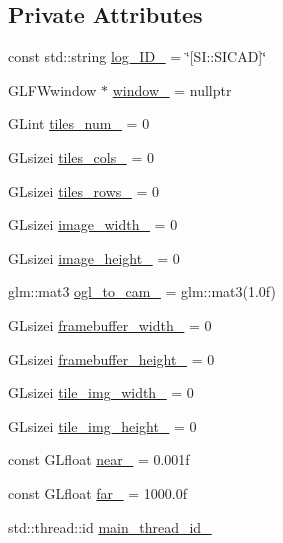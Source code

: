 \subsection*{Private Attributes}
\begin{DoxyCompactItemize}
\item 
const std\+::string \mbox{\hyperlink{classSICAD_a9eb34b659cac13b8442ca821455cc1f1}{log\+\_\+\+I\+D\+\_\+}} = \char`\"{}\mbox{[}S\+I\+::\+S\+I\+C\+AD\mbox{]}\char`\"{}
\item 
G\+L\+F\+Wwindow $\ast$ \mbox{\hyperlink{classSICAD_a3e55fa9ffa99ef200bfc15d6a105698a}{window\+\_\+}} = nullptr
\item 
G\+Lint \mbox{\hyperlink{classSICAD_a68723ee57cc9a1e02bc0dbda54a584ff}{tiles\+\_\+num\+\_\+}} = 0
\item 
G\+Lsizei \mbox{\hyperlink{classSICAD_ac2678cc1ad1b008912fec7e6892b23e1}{tiles\+\_\+cols\+\_\+}} = 0
\item 
G\+Lsizei \mbox{\hyperlink{classSICAD_aca3efa8f3fb75b3ee02474d4ec00e49e}{tiles\+\_\+rows\+\_\+}} = 0
\item 
G\+Lsizei \mbox{\hyperlink{classSICAD_ade37d5c3960d164acaa749745f55070f}{image\+\_\+width\+\_\+}} = 0
\item 
G\+Lsizei \mbox{\hyperlink{classSICAD_a093da94bc84a46d08f71051c4d88c176}{image\+\_\+height\+\_\+}} = 0
\item 
glm\+::mat3 \mbox{\hyperlink{classSICAD_a95af2758122e6420369516fd13fd03cc}{ogl\+\_\+to\+\_\+cam\+\_\+}} = glm\+::mat3(1.\+0f)
\item 
G\+Lsizei \mbox{\hyperlink{classSICAD_a08c86b826a1784b132bac3f0792fc604}{framebuffer\+\_\+width\+\_\+}} = 0
\item 
G\+Lsizei \mbox{\hyperlink{classSICAD_a3361bb03e52bc0554bb1e3670ef3a0f9}{framebuffer\+\_\+height\+\_\+}} = 0
\item 
G\+Lsizei \mbox{\hyperlink{classSICAD_a1dda156a616e004de5364914d8d6c4b9}{tile\+\_\+img\+\_\+width\+\_\+}} = 0
\item 
G\+Lsizei \mbox{\hyperlink{classSICAD_a2e6b01258527769e4066262ed002fc69}{tile\+\_\+img\+\_\+height\+\_\+}} = 0
\item 
const G\+Lfloat \mbox{\hyperlink{classSICAD_a690437655965101bad97d32e98015dd5}{near\+\_\+}} = 0.\+001f
\item 
const G\+Lfloat \mbox{\hyperlink{classSICAD_a4c4d2e249ac824528e1fe9f97fa207d9}{far\+\_\+}} = 1000.\+0f
\item 
std\+::thread\+::id \mbox{\hyperlink{classSICAD_a6a4623d27b2ee48ad0db90bd075c708c}{main\+\_\+thread\+\_\+id\+\_\+}}

\end{DoxyCompactItemize}
